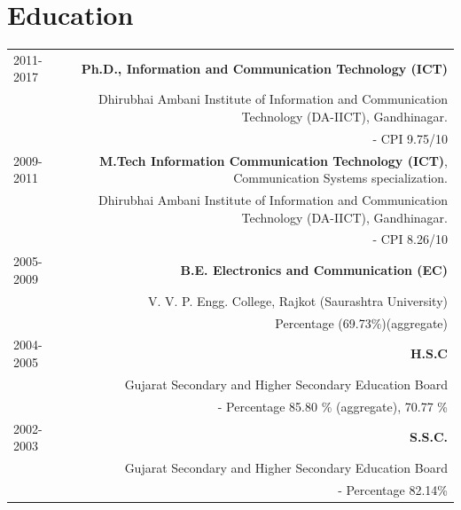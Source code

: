 \documentclass[10pt]{article}
\begin{document}
\section*{Education}
\begin{tabular}{L!{\VRule}R}
2011-2017& \textbf{Ph.D., Information and Communication Technology (ICT)}\\& Dhirubhai Ambani Institute of Information and Communication Technology (DA-IICT), Gandhinagar.\\&- CPI 9.75/10 \vspace{0.4cm}\\
2009-2011&\textbf{M.Tech Information Communication Technology (ICT)}, Communication Systems specialization. \\&Dhirubhai Ambani Institute of Information and Communication Technology (DA-IICT), Gandhinagar.\\&- CPI 8.26/10\vspace{0.4cm}\\
2005-2009&\textbf{B.E. Electronics and Communication (EC)}\\&V. V. P. Engg. College, Rajkot (Saurashtra University)\\& Percentage (69.73\%)(aggregate)\vspace{0.3cm}\\
2004-2005&\textbf{H.S.C}\\&Gujarat Secondary and Higher Secondary Education Board\\&- Percentage 85.80 \% (aggregate), 70.77 \%\vspace{0.4cm}\\
2002-2003&\textbf{S.S.C.}\\&Gujarat Secondary and Higher Secondary Education Board\\&- Percentage 82.14\% 
\end{tabular}
\vspace{0.25cm}
\end{document}
